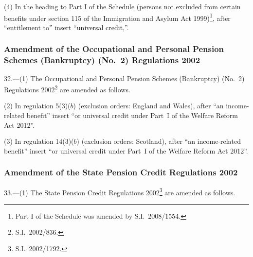 \documentclass[12pt,a4paper]{article}
\begin{document}
(4) In the heading to Part I of the Schedule (persons not excluded from certain benefits under section 115 of the Immigration and Asylum Act 1999)\footnote{Part I of the Schedule was amended by S.I.~2008/1554.}, after “entitlement to” insert “universal credit,”.

\subsubsection[32. Amendment of the Occupational and Personal Pension Schemes (Bankruptcy) (No.~2) Regulations 2002]{Amendment of the Occupational and Personal Pension Schemes (Bankruptcy) (No.~2) Regulations 2002}

32.—(1) The Occupational and Personal Pension Schemes (Bankruptcy) (No.~2) Regulations 2002\footnote{S.I.~2002/836.} are amended as follows.

(2) In regulation 5(3)($b$)  (exclusion orders: England and Wales), after “an income-related benefit” insert “or universal credit under Part~I of the Welfare Reform Act 2012”.

(3) In regulation 14(3)($b$)  (exclusion orders: Scotland), after “an income-related benefit” insert “or universal credit under Part~I of the Welfare Reform Act 2012”.

\subsubsection[33. Amendment of the State Pension Credit Regulations 2002]{Amendment of the State Pension Credit Regulations 2002}

33.—(1) The State Pension Credit Regulations 2002\footnote{S.I.~2002/1792.} are amended as follows.
\end{document}
